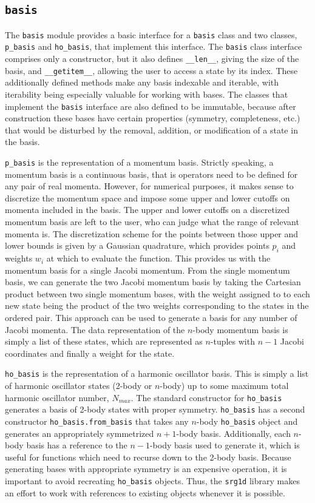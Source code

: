\subsection{\texttt{basis}}

The \texttt{basis} module provides a basic interface for a \texttt{basis} class and two classes, \texttt{p\_basis} and \texttt{ho\_basis}, that implement this interface. The \texttt{basis} class interface comprises only a constructor, but it also defines \texttt{\_\_len\_\_}, giving the size of the basis, and \texttt{\_\_getitem\_\_}, allowing the user to access a state by its index. These additionally defined methods make any basis indexable and iterable, with iterability being especially valuable for working with bases. The classes that implement the \texttt{basis} interface are also defined to be immutable, because after construction these bases have certain properties (symmetry, completeness, etc.) that would be disturbed by the removal, addition, or modification of a state in the basis.

\texttt{p\_basis} is the representation of a momentum basis. Strictly speaking, a momentum basis is a continuous basis, that is operators need to be defined for any pair of real momenta. However, for numerical purposes, it makes sense to discretize the momentum space and impose some upper and lower cutoffs on momenta included in the basis. The upper and lower cutoffs on a discretized momentum basis are left to the user, who can judge what the range of relevant momenta is. The discretization scheme for the points between those upper and lower bounds is given by a Gaussian quadrature, which provides points $p_i$ and weights $w_i$ at which to evaluate the function. This provides us with the momentum basis for a single Jacobi momentum. From the single momentum basis, we can generate the two Jacobi momentum basis by taking the Cartesian product between two single momentum bases, with the weight assigned to to each new state being the product of the two weights corresponding to the states in the ordered pair. This approach can be used to generate a basis for any number of Jacobi momenta. The data representation of the $n$-body momentum basis is simply a list of these states, which are represented as $n$-tuples with $n-1$ Jacobi coordinates and finally a weight for the state.

\texttt{ho\_basis} is the representation of a harmonic oscillator basis. This is simply a list of harmonic oscillator states (2-body or $n$-body) up to some maximum total harmonic oscillator number, $N_{max}$. The standard constructor for \texttt{ho\_basis} generates a basis of 2-body states with proper symmetry. \texttt{ho\_basis} has a second constructor \texttt{ho\_basis.from\_basis} that takes any $n$-body \texttt{ho\_basis} object and generates an appropriately symmetrized $n+1$-body basis. Additionally, each $n$-body basis has a reference to the $n-1$-body basis used to generate it, which is useful for functions which need to recurse down to the 2-body basis. Because generating bases with appropriate symmetry is an expensive operation, it is important to avoid recreating \texttt{ho\_basis} objects. Thus, the \texttt{srg1d} library makes an effort to work with references to existing objects whenever it is possible.

